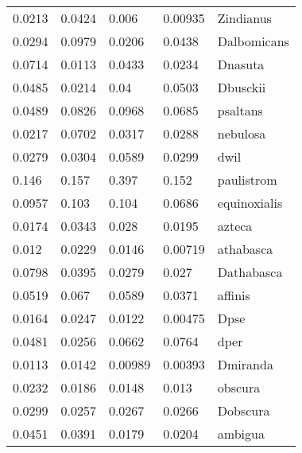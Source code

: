 \begin{tabular}{lllll}
         0.0213 &          0.0424 &           0.006 &       0.00935 &               Zindianus \\
         0.0294 &          0.0979 &          0.0206 &        0.0438 &             Dalbomicans \\
         0.0714 &          0.0113 &          0.0433 &        0.0234 &                 Dnasuta \\
         0.0485 &          0.0214 &            0.04 &        0.0503 &                Dbusckii \\
         0.0489 &          0.0826 &          0.0968 &        0.0685 &                psaltans \\
         0.0217 &          0.0702 &          0.0317 &        0.0288 &                nebulosa \\
         0.0279 &          0.0304 &          0.0589 &        0.0299 &                    dwil \\
          0.146 &           0.157 &           0.397 &         0.152 &              paulistrom \\
         0.0957 &           0.103 &           0.104 &        0.0686 &            equinoxialis \\
         0.0174 &          0.0343 &           0.028 &        0.0195 &                  azteca \\
          0.012 &          0.0229 &          0.0146 &       0.00719 &               athabasca \\
         0.0798 &          0.0395 &          0.0279 &         0.027 &              Dathabasca \\
         0.0519 &           0.067 &          0.0589 &        0.0371 &                 affinis \\
         0.0164 &          0.0247 &          0.0122 &       0.00475 &                    Dpse \\
         0.0481 &          0.0256 &          0.0662 &        0.0764 &                    dper \\
         0.0113 &          0.0142 &         0.00989 &       0.00393 &                Dmiranda \\
         0.0232 &          0.0186 &          0.0148 &         0.013 &                 obscura \\
         0.0299 &          0.0257 &          0.0267 &        0.0266 &                Dobscura \\
         0.0451 &          0.0391 &          0.0179 &        0.0204 &                 ambigua \\

\end{tabular}
